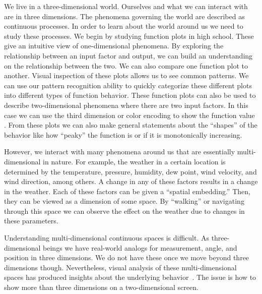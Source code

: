 
We live in a three-dimensional world. 
Ourselves and what we can interact with are in three dimensions.
The phenomena governing the world are described as continuous processes.
In order to learn about the world around us we need to study these processes.
We begin by studying function plots in high 
school. These give an intuitive view of one-dimensional 
phenomena. 
By exploring the relationship
between an input factor
and output,
we can build an understanding on the relationship between the two.
We can also compare one function plot to another. Visual inspection of these plots
allows us to see common patterns. We can use our pattern recognition ability
to quickly categorize these different plots into different types of function
behavior. These function plots can also be used to describe two-dimensional
phenomena where there are two input factors. In this case we can use the third
dimension or color encoding to show the function value . 
From these plots we can also make general statements about the ``shapes'' of
the behavior like how ``peaky'' the function is or if it is monotonically
increasing.

However, we interact with many phenomena around us that are essentially
multi-dimensional in nature. For example, the weather in a certain location is
determined by the temperature, pressure, humidity, dew point, wind velocity,
and wind direction, among others. A change in any of these factors results in a
change in the weather. Each of these factors can be given a ``spatial
embedding.'' Then, they can be viewed as a dimension of some space.  By
``walking'' or navigating through this space we can observe the effect on the
weather due to changes in these parameters. 

Understanding multi-dimensional continuous spaces is difficult. As
three-dimensional beings we have real-world analogs for measurement,
angle, and position in three dimensions. We do not have these once we
move beyond three dimensions though. Nevertheless, visual analysis of
these multi-dimensional spaces has produced insights about the
underlying behavior~\cite{Sedlmair:2014}. The issue is how to show more
than three dimensions on a two-dimensional screen. 

